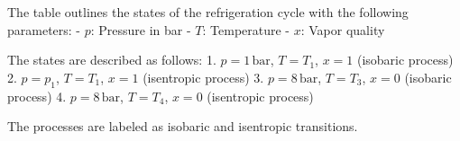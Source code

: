 The table outlines the states of the refrigeration cycle with the following parameters:  
- \( p \): Pressure in bar  
- \( T \): Temperature  
- \( x \): Vapor quality  

The states are described as follows:  
1. \( p = 1 \, \text{bar} \), \( T = T_1 \), \( x = 1 \) (isobaric process)  
2. \( p = p_1 \), \( T = T_1 \), \( x = 1 \) (isentropic process)  
3. \( p = 8 \, \text{bar} \), \( T = T_3 \), \( x = 0 \) (isobaric process)  
4. \( p = 8 \, \text{bar} \), \( T = T_4 \), \( x = 0 \) (isentropic process)  

The processes are labeled as isobaric and isentropic transitions.